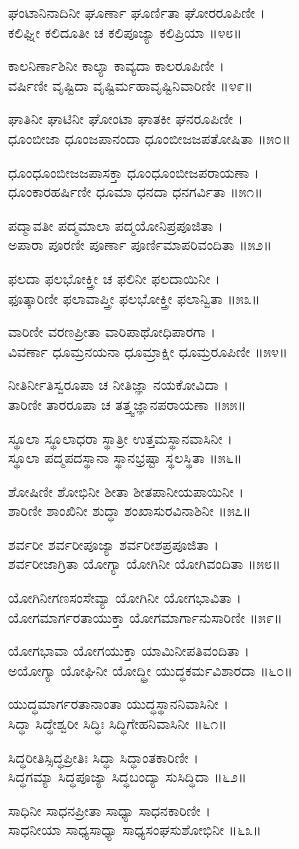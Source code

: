 ಘಂಟಾನಿನಾದಿನೀ ಘೂರ್ಣಾ ಘೂರ್ಣಿತಾ ಘೋರರೂಪಿಣೀ ।\\
ಕಲಿಘ್ನೀ ಕಲಿದೂತೀ ಚ ಕಲಿಪೂಜ್ಯಾ ಕಲಿಪ್ರಿಯಾ ॥೪೮॥

ಕಾಲನಿರ್ಣಾಶಿನೀ ಕಾಲ್ಯಾ ಕಾವ್ಯದಾ ಕಾಲರೂಪಿಣೀ ।\\
ವರ್ಷಿಣೀ ವೃಷ್ಟಿದಾ ವೃಷ್ಟಿರ್ಮಹಾವೃಷ್ಟಿನಿವಾರಿಣೀ ॥೪೯॥

ಘಾತಿನೀ ಘಾಟಿನೀ ಘೋಂಟಾ ಘಾತಕೀ ಘನರೂಪಿಣೀ ।\\
ಧೂಂಬೀಜಾ ಧೂಂಜಪಾನಂದಾ ಧೂಂಬೀಜಜಪತೋಷಿತಾ ॥೫೦॥

ಧೂಂಧೂಂಬೀಜಜಪಾಸಕ್ತಾ ಧೂಂಧೂಂಬೀಜಪರಾಯಣಾ ।\\
ಧೂಂಕಾರಹರ್ಷಿಣೀ ಧೂಮಾ ಧನದಾ ಧನಗರ್ವಿತಾ ॥೫೧॥

ಪದ್ಮಾವತೀ ಪದ್ಮಮಾಲಾ ಪದ್ಮಯೋನಿಪ್ರಪೂಜಿತಾ ।\\
ಅಪಾರಾ ಪೂರಣೀ ಪೂರ್ಣಾ ಪೂರ್ಣಿಮಾಪರಿವಂದಿತಾ ॥೫೨॥

ಫಲದಾ ಫಲಭೋಕ್ತ್ರೀ ಚ ಫಲಿನೀ ಫಲದಾಯಿನೀ ।\\
ಫೂತ್ಕಾರಿಣೀ ಫಲಾವಾಪ್ತ್ರೀ ಫಲಭೋಕ್ತ್ರೀ ಫಲಾನ್ವಿತಾ ॥೫೩॥

ವಾರಿಣೀ ವರಣಪ್ರೀತಾ ವಾರಿಪಾಥೋಧಿಪಾರಗಾ ।\\
ವಿವರ್ಣಾ ಧೂಮ್ರನಯನಾ ಧೂಮ್ರಾಕ್ಷೀ ಧೂಮ್ರರೂಪಿಣೀ ॥೫೪॥

ನೀತಿರ್ನೀತಿಸ್ವರೂಪಾ ಚ ನೀತಿಜ್ಞಾ ನಯಕೋವಿದಾ ।\\
ತಾರಿಣೀ ತಾರರೂಪಾ ಚ ತತ್ತ್ವಜ್ಞಾನಪರಾಯಣಾ ॥೫೫॥

ಸ್ಥೂಲಾ ಸ್ಥೂಲಾಧರಾ ಸ್ಥಾತ್ರೀ ಉತ್ತಮಸ್ಥಾನವಾಸಿನೀ ।\\
ಸ್ಥೂಲಾ ಪದ್ಮಪದಸ್ಥಾನಾ ಸ್ಥಾನಭ್ರಷ್ಟಾ ಸ್ಥಲಸ್ಥಿತಾ ॥೫೬॥

ಶೋಷಿಣೀ ಶೋಭಿನೀ ಶೀತಾ ಶೀತಪಾನೀಯಪಾಯಿನೀ ।\\
ಶಾರಿಣೀ ಶಾಂಖಿನೀ ಶುದ್ಧಾ ಶಂಖಾಸುರವಿನಾಶಿನೀ ॥೫೭॥

ಶರ್ವರೀ ಶರ್ವರೀಪೂಜ್ಯಾ ಶರ್ವರೀಶಪ್ರಪೂಜಿತಾ ।\\
ಶರ್ವರೀಜಾಗ್ರಿತಾ ಯೋಗ್ಯಾ ಯೋಗಿನೀ ಯೋಗಿವಂದಿತಾ ॥೫೮॥

ಯೋಗಿನೀಗಣಸಂಸೇವ್ಯಾ ಯೋಗಿನೀ ಯೋಗಭಾವಿತಾ ।\\
ಯೋಗಮಾರ್ಗರತಾಯುಕ್ತಾ ಯೋಗಮಾರ್ಗಾನುಸಾರಿಣೀ ॥೫೯॥

ಯೋಗಭಾವಾ ಯೋಗಯುಕ್ತಾ ಯಾಮಿನೀಪತಿವಂದಿತಾ ।\\
ಅಯೋಗ್ಯಾ ಯೋಘಿನೀ ಯೋದ್ಧ್ರೀ ಯುದ್ಧಕರ್ಮವಿಶಾರದಾ ॥೬೦॥

ಯುದ್ಧಮಾರ್ಗರತಾನಾಂತಾ ಯುದ್ಧಸ್ಥಾನನಿವಾಸಿನೀ ।\\
ಸಿದ್ಧಾ ಸಿದ್ಧೇಶ್ವರೀ ಸಿದ್ಧಿಃ ಸಿದ್ಧಿಗೇಹನಿವಾಸಿನೀ ॥೬೧॥

ಸಿದ್ಧರೀತಿಸ್ಸಿದ್ಧಪ್ರೀತಿಃ ಸಿದ್ಧಾ ಸಿದ್ಧಾಂತಕಾರಿಣೀ ।\\
ಸಿದ್ಧಗಮ್ಯಾ ಸಿದ್ಧಪೂಜ್ಯಾ ಸಿದ್ಧಬಂದ್ಯಾ ಸುಸಿದ್ಧಿದಾ ॥೬೨॥

ಸಾಧಿನೀ ಸಾಧನಪ್ರೀತಾ ಸಾಧ್ಯಾ ಸಾಧನಕಾರಿಣೀ ।\\
ಸಾಧನೀಯಾ ಸಾಧ್ಯಸಾಧ್ಯಾ ಸಾಧ್ಯಸಂಘಸುಶೋಭಿನೀ ॥೬೩॥

